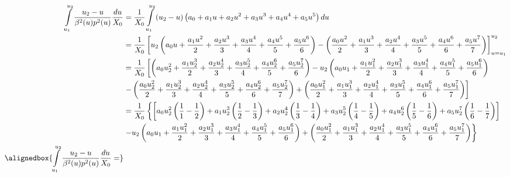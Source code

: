 \documentclass[a4paper,landscape]{article}
\begin{document}
\begin{align*}
    \int\limits_{u_1}^{u_2} \dfrac{u_2-u}{\beta^2(u) p^2(u)}\dfrac{du}{X_0} &= \dfrac{1}{X_0}\int\limits_{u_1}^{u_2}\left(u_2-u\right)\left(a_0 +a_1u + a_2u^2+a_3u^3+a_4u^4+a_5u^5\right)du\\
    &= \dfrac{1}{X_0}
    \left[
        u_2
        \left(
            a_0u + \dfrac{a_1u^2}{2} + \dfrac{a_2u^3}{3} + \dfrac{a_3u^4}{4} + \dfrac{a_4u^5}{5} + \dfrac{a_5u^6}{6}
        \right)
        -
        \left(
            \dfrac{a_0u^2}{2} + \dfrac{a_1u^3}{3} + \dfrac{a_2u^4}{4} + \dfrac{a_3u^5}{5} + \dfrac{a_4u^6}{6} + \dfrac{a_5u^7}{7}
        \right)
    \right]_{u=u_1}^{u_2}
    \\
    &= \dfrac{1}{X_0}
    \left[
        \left(
            a_0u_2^2 + \dfrac{a_1u_2^3}{2} + \dfrac{a_2u_2^4}{3} + \dfrac{a_3u_2^5}{4} + \dfrac{a_4u_2^6}{5} + \dfrac{a_5u_2^7}{6}
        \right)
        -
        u_2
        \left(
            a_0u_1 + \dfrac{a_1u_1^2}{2} + \dfrac{a_2u_1^3}{3} + \dfrac{a_3u_1^4}{4} + \dfrac{a_4u_1^5}{5} + \dfrac{a_5u_1^6}{6}
        \right)
    \right.
    \\
    &
    \left.
        -
        \left(
            \dfrac{a_0u_2^2}{2} + \dfrac{a_1u_2^3}{3} + \dfrac{a_2u_2^4}{4} + \dfrac{a_3u_2^5}{5} + \dfrac{a_4u_2^6}{6} + \dfrac{a_5u_2^7}{7}
        \right)
        +
        \left(
            \dfrac{a_0u_1^2}{2} + \dfrac{a_1u_1^3}{3} + \dfrac{a_2u_1^4}{4} + \dfrac{a_3u_1^5}{5} + \dfrac{a_4u_1^6}{6} + \dfrac{a_5u_1^7}{7}
        \right)
    \right]
    \\
    &= \dfrac{1}{X_0}
    \left\{
        \left[
              a_0u_2^2\left(\dfrac{1}{1}- \dfrac{1}{2}\right)
            + a_1u_2^3\left(\dfrac{1}{2} - \dfrac{1}{3}\right)
            + a_2u_2^4\left(\dfrac{1}{3} - \dfrac{1}{4}\right)
            + a_3u_2^5\left(\dfrac{1}{4} - \dfrac{1}{5}\right)
            + a_4u_2^6\left(\dfrac{1}{5} - \dfrac{1}{6}\right)
            + a_5u_2^7\left(\dfrac{1}{6} - \dfrac{1}{7}\right)
        \right]
    \right.
    \\
    &
    \left.
        -
        u_2
        \left(
            a_0u_1 + \dfrac{a_1u_1^2}{2} + \dfrac{a_2u_1^3}{3} + \dfrac{a_3u_1^4}{4} + \dfrac{a_4u_1^5}{5} + \dfrac{a_5u_1^6}{6}
        \right)
        +
        \left(
            \dfrac{a_0u_1^2}{2} + \dfrac{a_1u_1^3}{3} + \dfrac{a_2u_1^4}{4} + \dfrac{a_3u_1^5}{5} + \dfrac{a_4u_1^6}{6} + \dfrac{a_5u_1^7}{7}
        \right)
    \right\}
    \\
    \alignedbox
    {
        \int\limits_{u_1}^{u_2} \dfrac{u_2-u}{\beta^2(u) p^2(u)}\dfrac{du}{X_0} =
}
\end{align*}
\end{document}
